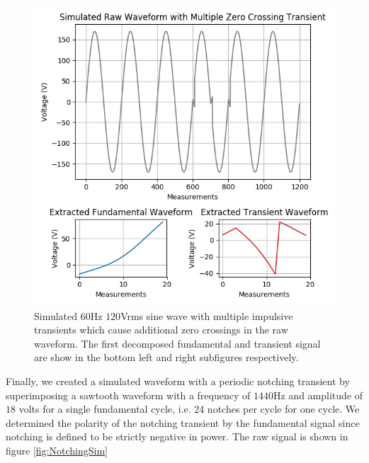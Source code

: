 \documentclass[10pt, conference, compsocconf]{IEEEtran}
\begin{document}
\begin{figure}[ht]
\centering%
\includegraphics[scale=0.35]{./figures/mult_z_crossing_sim.png}
\caption{Simulated $60$Hz $120$Vrms sine wave with multiple impulsive transients which cause additional zero crossings in the raw waveform. The first decomposed fundamental and transient signal are show in the bottom left and right subfigures respectively.}\label{fig:MultZSim}
\end{figure}

Finally, we created a simulated waveform with a periodic notching transient by superimposing a sawtooth waveform with a frequency of $1440$Hz and amplitude of $18$ volts for a single fundamental cycle, i.e. 24 notches per cycle for one cycle. We determined the polarity of the notching transient by the fundamental signal since notching is defined to be strictly negative in power. The raw signal is shown in figure \ref{fig:NotchingSim}
\end{document}
